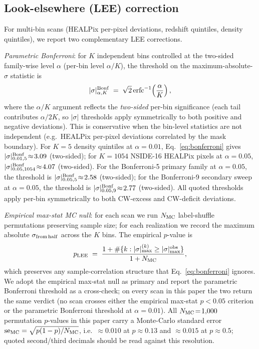 \documentclass[aps,prd,twocolumn,superscriptaddress,showpacs,preprintnumbers,nofootinbib,longbibliography,floatfix]{revtex4-2}
\begin{document}
\subsection{Look-elsewhere (LEE) correction}\label{sec:lee}

For multi-bin scans (HEALPix per-pixel deviations, redshift quintiles,
density quintiles), we report two complementary LEE corrections.

\emph{Parametric Bonferroni}: for $K$ independent bins controlled at
the two-sided family-wise level $\alpha$ (per-bin level $\alpha/K$),
the threshold on the maximum-absolute-$\sigma$ statistic is
\begin{equation}\label{eq:bonferroni}
|\sigma|^{\rm Bonf}_{\alpha,K} \;=\; \sqrt{2}\,
\mathrm{erfc}^{-1}\!\left(\frac{\alpha}{K}\right),
\end{equation}
where the $\alpha/K$ argument reflects the \emph{two-sided} per-bin
significance (each tail contributes $\alpha/2K$, so $|\sigma|$
thresholds apply symmetrically to both positive and negative
deviations). This is conservative when the bin-level statistics are not
independent (e.g.\ HEALPix per-pixel deviations correlated by the
mask boundary). For $K\!=\!5$ density quintiles at $\alpha\!=\!0.01$,
Eq.~\eqref{eq:bonferroni} gives $|\sigma|^{\rm Bonf}_{0.01,5}\!\approx\!3.09$
(two-sided); for $K\!=\!1054$ NSIDE-16 HEALPix pixels at $\alpha\!=\!0.05$,
$|\sigma|^{\rm Bonf}_{0.05,1054}\!\approx\!4.07$ (two-sided). For the
Bonferroni-5 primary family at $\alpha\!=\!0.05$, the threshold is
$|\sigma|^{\rm Bonf}_{0.05,5}\!\approx\!2.58$ (two-sided); for the Bonferroni-9
secondary sweep at $\alpha\!=\!0.05$, the threshold is
$|\sigma|^{\rm Bonf}_{0.05,9}\!\approx\!2.77$ (two-sided). All quoted
thresholds apply per-bin symmetrically to both CW-excess and CW-deficit
deviations.

\emph{Empirical max-stat MC null}: for each scan we run $N_{\rm MC}$
label-shuffle permutations preserving sample size; for each
realization we record the maximum absolute $\sigma_{\rm from\,half}$
across the $K$ bins. The empirical $p$-value is
\begin{equation}\label{eq:empirical_p}
p_{\rm LEE} \;=\; \frac{1 + \#\{k : |\sigma|_{\max}^{(k)} \ge |\sigma|_{\max}^{\rm obs}\}}{1 + N_{\rm MC}},
\end{equation}
which preserves any sample-correlation structure that
Eq.~\eqref{eq:bonferroni} ignores. We adopt the empirical max-stat
null as primary and report the parametric Bonferroni threshold as a
cross-check; on every scan in this paper the two return the same
verdict (no scan crosses either the empirical max-stat $p < 0.05$
criterion or the parametric Bonferroni threshold at
$\alpha\!=\!0.01$). All $N_{\rm MC}\!=\!1{,}000$ permutation
$p$-values in this paper carry a Monte-Carlo standard error
${\rm se}_{\rm MC} = \sqrt{p(1-p)/N_{\rm MC}}$, i.e.\
${\approx}0.010$ at $p \approx 0.13$ and ${\approx}0.015$ at
$p \approx 0.5$; quoted second/third decimals should be read against
this resolution.
\end{document}
